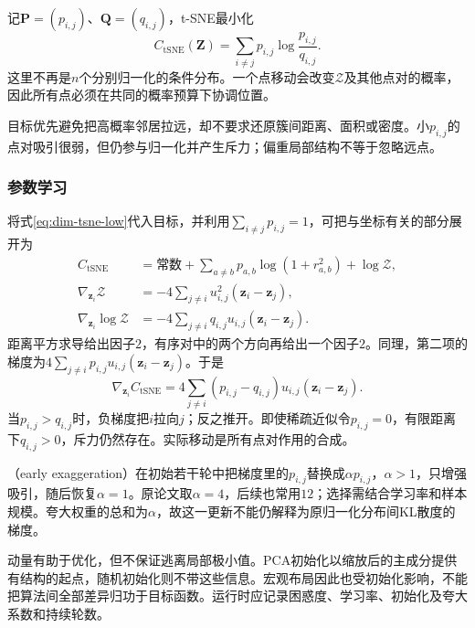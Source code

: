 记$\bm{P}=(p_{i,j})$、$\bm{Q}=(q_{i,j})$，t-SNE最小化
\begin{equation}
  \label{eq:dim-tsne-loss}
  C_{\mathrm{tSNE}}(\bm{Z})
    =\sum_{i\ne j}p_{i,j}\log\frac{p_{i,j}}{q_{i,j}}.
\end{equation}
这里不再是$n$个分别归一化的条件分布。一个点移动会改变$\mathcal{Z}$及其他点对的概率，因此所有点必须在共同的概率预算下协调位置。

目标优先避免把高概率邻居拉远，却不要求还原簇间距离、面积或密度。小$p_{i,j}$的点对吸引很弱，但仍参与归一化并产生斥力；偏重局部结构不等于忽略远点。

\subsubsection{参数学习}

将式\eqref{eq:dim-tsne-low}代入目标，并利用$\sum_{i\ne j}p_{i,j}=1$，可把与坐标有关的部分展开为
\begin{equation}
  \label{eq:dim-tsne-gradient-derivation}
  \begin{aligned}
    C_{\mathrm{tSNE}}
      &=\text{常数}
        +\sum_{a\ne b}p_{a,b}\log(1+r_{a,b}^2)
        +\log\mathcal{Z},\\
    \nabla_{\bm{z}_i}\mathcal{Z}
      &=-4\sum_{j\ne i}u_{i,j}^2(\bm{z}_i-\bm{z}_j),\\
    \nabla_{\bm{z}_i}\log\mathcal{Z}
      &=-4\sum_{j\ne i}q_{i,j}u_{i,j}(\bm{z}_i-\bm{z}_j).
  \end{aligned}
\end{equation}
距离平方求导给出因子$2$，有序对中的两个方向再给出一个因子$2$。同理，第二项的梯度为$4\sum_{j\ne i}p_{i,j}u_{i,j}(\bm{z}_i-\bm{z}_j)$。于是
\begin{equation}
  \label{eq:dim-tsne-gradient}
  \nabla_{\bm{z}_i}C_{\mathrm{tSNE}}
    =4\sum_{j\ne i}(p_{i,j}-q_{i,j})u_{i,j}
      (\bm{z}_i-\bm{z}_j).
\end{equation}
当$p_{i,j}>q_{i,j}$时，负梯度把$i$拉向$j$；反之推开。即使稀疏近似令$p_{i,j}=0$，有限距离下$q_{i,j}>0$，斥力仍然存在。实际移动是所有点对作用的合成。

（early exaggeration）在初始若干轮中把梯度里的$p_{i,j}$替换成$\alpha p_{i,j}$，$\alpha>1$，只增强吸引，随后恢复$\alpha=1$。原论文取$\alpha=4$，后续也常用$12$；选择需结合学习率和样本规模。夸大权重的总和为$\alpha$，故这一更新不能仍解释为原归一化分布间KL散度的梯度。

动量有助于优化，但不保证逃离局部极小值。PCA初始化以缩放后的主成分提供有结构的起点，随机初始化则不带这些信息。宏观布局因此也受初始化影响，不能把算法间全部差异归功于目标函数。运行时应记录困惑度、学习率、初始化及夸大系数和持续轮数。

